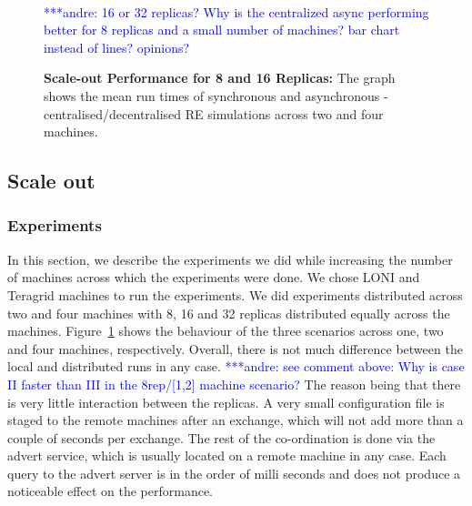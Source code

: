 \documentclass{rspublic}
\newcommand{\alnote}[1]{ {\textcolor{blue} { ***andre: #1 }}}
\newcommand{\alnote}[1]{}
\begin{document}
%
\begin{figure}%
\centering
{}\qquad
{}\\
\caption{\textbf{Scale-out Performance for 8 and 16 Replicas:} 
  The graph shows the mean run times of synchronous and
  asynchronous - centralised/decentralised RE simulations across two
  and four machines.}
  \alnote{16 or 32 replicas? Why is the centralized async performing better for 8 replicas and a small number of machines? bar chart instead of lines? opinions?}
\label{fig:24machines}
\end{figure}

\subsection{Scale out}

\subsubsection{Experiments}
In this section, we describe the experiments we did while increasing
the number of machines across which the experiments were done. We
chose LONI and Teragrid machines to run the experiments. We did
experiments distributed across two and four machines with 8, 16 and 32
replicas distributed equally across the machines.
Figure~\ref{fig:24machines} shows the behaviour of the three scenarios 
across one, two and four machines,
respectively. Overall, there is not much difference between the local
and distributed runs in any case. \alnote{see comment above: Why is case II faster than III 
in the 8rep/[1,2] machine scenario?} The reason being that there is very
little interaction between the replicas. A very small configuration
file is staged to the remote machines after an exchange, which will
not add more than a couple of seconds per exchange. The rest of the
co-ordination is done via the advert service, which is usually located
on a remote machine in any case. Each query to the advert server is in
the order of milli seconds and does not produce a noticeable effect on
the performance.
\end{document}
